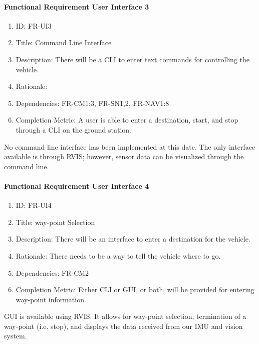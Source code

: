 \documentclass[compsoc,draftclsnofoot,onecolumn,10pt]{IEEEtran}
\begin{document}
	\paragraph{\textbf{Functional Requirement User Interface 3}}
		\begin{enumerate}
			\item ID: FR-UI3
			\item Title: Command Line Interface
			\item Description: There will be a CLI to enter text commands for controlling the vehicle.
			\item Rationale: 
			\item Dependencies: FR-CM1:3, FR-SN1,2, FR-NAV1:8
			\item Completion Metric: A user is able to enter a destination, start, and stop through a CLI on the ground station.
		\end{enumerate}
    No command line interface has been implemented at this date. The only interface available is through RVIS; however, sensor data can be visualized through the command line.
    
	\paragraph{\textbf{Functional Requirement User Interface 4}}
		\begin{enumerate}
			\item ID: FR-UI4
			\item Title: way-point Selection
			\item Description: There will be an interface to enter a destination for the vehicle.
			\item Rationale: There needs to be a way to tell the vehicle where to go.
			\item Dependencies: FR-CM2
			\item Completion Metric: Either CLI or GUI, or both, will be provided for entering way-point information.
		\end{enumerate}
    GUI is available using RVIS. It allows for way-point selection, termination of a way-point (i.e. stop), and displays the data received from our IMU and vision system. 
    
\end{document}
